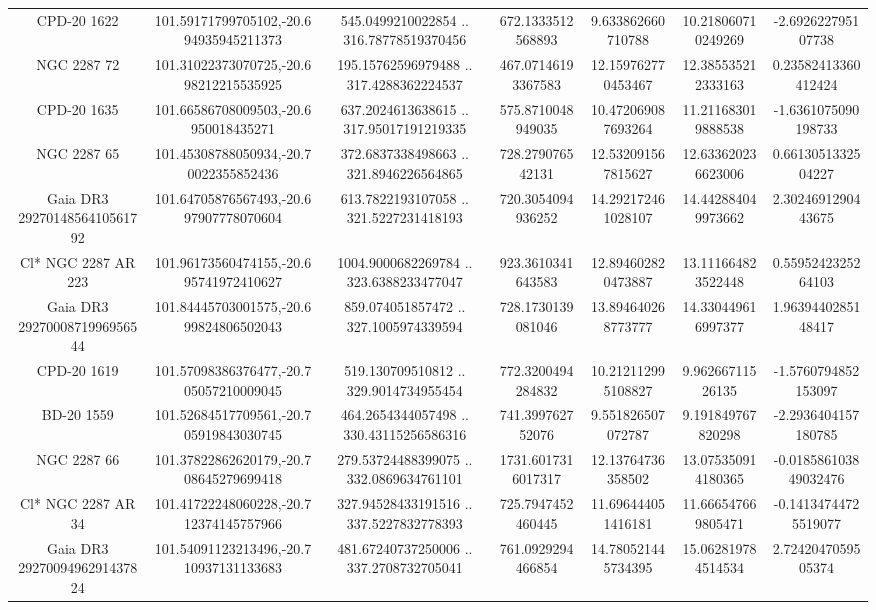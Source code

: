 \begin{table}
\begin{tabular}{ccccccc}
CPD-20  1622 & 101.59171799705102,-20.694935945211373 & 545.0499210022854 .. 316.78778519370456 & 672.1333512568893 & 9.633862660710788 & 10.218060710249269 & -2.692622795107738 \\
NGC  2287    72 & 101.31022373070725,-20.698212215535925 & 195.15762596979488 .. 317.4288362224537 & 467.07146193367583 & 12.159762770453467 & 12.385535212333163 & 0.23582413360412424 \\
CPD-20  1635 & 101.66586708009503,-20.6950018435271 & 637.2024613638615 .. 317.95017191219335 & 575.8710048949035 & 10.472069087693264 & 11.211683019888538 & -1.6361075090198733 \\
NGC  2287    65 & 101.45308788050934,-20.70022355852436 & 372.6837338498663 .. 321.8946226564865 & 728.279076542131 & 12.532091567815627 & 12.633620236623006 & 0.6613051332504227 \\
Gaia DR3 2927014856410561792 & 101.64705876567493,-20.697907778070604 & 613.7822193107058 .. 321.5227231418193 & 720.3054094936252 & 14.292172461028107 & 14.442884049973662 & 2.3024691290443675 \\
Cl* NGC 2287     AR     223 & 101.96173560474155,-20.695741972410627 & 1004.9000682269784 .. 323.6388233477047 & 923.3610341643583 & 12.894602820473887 & 13.111664823522448 & 0.5595242325264103 \\
Gaia DR3 2927000871996956544 & 101.84445703001575,-20.699824806502043 & 859.074051857472 .. 327.1005974339594 & 728.1730139081046 & 13.894640268773777 & 14.330449616997377 & 1.9639440285148417 \\
CPD-20  1619 & 101.57098386376477,-20.705057210009045 & 519.130709510812 .. 329.9014734955454 & 772.3200494284832 & 10.212112995108827 & 9.96266711526135 & -1.5760794852153097 \\
BD-20  1559 & 101.52684517709561,-20.705919843030745 & 464.2654344057498 .. 330.43115256586316 & 741.399762752076 & 9.551826507072787 & 9.191849767820298 & -2.2936404157180785 \\
NGC  2287    66 & 101.37822862620179,-20.708645279699418 & 279.53724488399075 .. 332.0869634761101 & 1731.6017316017317 & 12.13764736358502 & 13.075350914180365 & -0.018586103849032476 \\
Cl* NGC 2287     AR      34 & 101.41722248060228,-20.712374145757966 & 327.94528433191516 .. 337.5227832778393 & 725.7947452460445 & 11.696444051416181 & 11.666547669805471 & -0.14134744725519077 \\
Gaia DR3 2927009496291437824 & 101.54091123213496,-20.710937131133683 & 481.67240737250006 .. 337.2708732705041 & 761.0929294466854 & 14.780521445734395 & 15.062819784514534 & 2.7242047059505374 \\

\end{tabular}
\end{table}
